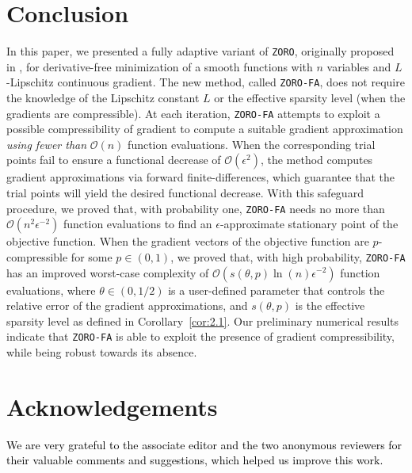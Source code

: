 \section{Conclusion}

In this paper, we presented a fully adaptive variant of {\tt ZORO}, originally proposed in \cite{cai2022zeroth}, for derivative-free minimization of a smooth functions with $n$ variables and $L$-Lipschitz continuous gradient. The new method, called {\tt ZORO-FA}, does not require the knowledge of the Lipschitz constant $L$ or the effective sparsity level (when the gradients are compressible). At each iteration, {\tt ZORO-FA} attempts to exploit a possible compressibility of gradient to compute a suitable gradient approximation \textit{using fewer than} $\mathcal{O}\left(n\right)$ function evaluations. When the corresponding trial points fail to ensure a functional decrease of $\mathcal{O}\left(\epsilon^{2}\right)$, the method computes gradient approximations via forward finite-differences, which guarantee that the trial points will yield the desired functional decrease. With this safeguard procedure, we proved that, with probability one, {\tt ZORO-FA} needs no more than $\mathcal{O}\left(n^2\epsilon^{-2}\right)$ function evaluations to find an $\epsilon$-approximate stationary point of the objective function. When the gradient vectors of the objective function are $p$-compressible for some $p\in (0,1)$, we proved that, with high probability, {\tt ZORO-FA} has an improved worst-case complexity of $\mathcal{O}\left(s(\theta,p)\ln(n)\epsilon^{-2}\right)$ function evaluations, where $\theta\in (0,1/2)$ is a user-defined parameter that controls the relative error of the gradient approximations, and $s(\theta,p)$ is the effective sparsity level as defined in Corollary~\ref{cor:2.1}.
Our preliminary numerical results indicate that {\tt ZORO-FA} is able to exploit the presence of gradient compressibility, while being robust towards its absence.

\section*{Acknowledgements} 
\textcolor{black}{We are very grateful to the associate editor and the two anonymous reviewers for their valuable comments and suggestions, which helped us improve this work.}

